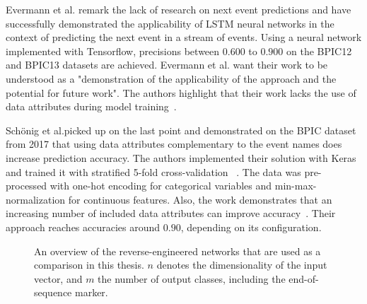 Evermann et al. remark the lack of research on next event predictions and have successfully demonstrated the applicability of LSTM neural networks in the context of predicting the next event in a stream of events. Using a neural network implemented with Tensorflow, precisions between $0.600$ to $0.900$ on the BPIC12 and BPIC13 datasets are achieved. Evermann et al. want their work to be understood as a "demonstration of the applicability of the approach and the potential for future work". The authors highlight that their work lacks the use of data attributes during model training~\cite{evermann2016}.

Schönig et al.picked up on the last point and demonstrated on the BPIC dataset from 2017 that using data attributes complementary to the event names does increase prediction accuracy. The authors implemented their solution with Keras and trained it with stratified 5-fold cross-validation~\cite{schoenig2018} .
The data was pre-processed with one-hot encoding for categorical variables and min-max-normalization for continuous features. Also, the work demonstrates that an increasing number of included data attributes can improve accuracy~\cite[p.5]{schoenig2018}. Their approach reaches accuracies around $0.90$, depending on its configuration.

\begin{figure}
\centering
{}
\qquad
{}
\caption[Overview of the reverse-engineered networks]{An overview of the reverse-engineered networks that are used as a comparison in this thesis. $n$ denotes the dimensionality of the input vector, and $m$ the number of output classes, including the end-of-sequence marker.}
\label{fig:benchmark-architectures}
\end{figure}

